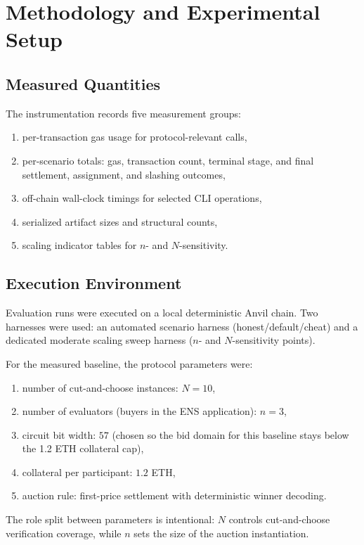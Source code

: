 \documentclass[final,twoside]{vutinfth}
\begin{document}
\section{Methodology and Experimental Setup}
\subsection{Measured Quantities}
The instrumentation records five measurement groups:
\begin{enumerate}
\item per-transaction gas usage for protocol-relevant calls,
\item per-scenario totals: gas, transaction count, terminal stage, and final settlement, assignment, and slashing outcomes,
\item off-chain wall-clock timings for selected CLI operations,
\item serialized artifact sizes and structural counts,
\item scaling indicator tables for \(n\)- and \(N\)-sensitivity.
\end{enumerate}

\subsection{Execution Environment}
Evaluation runs were executed on a local deterministic Anvil chain.
Two harnesses were used: an automated scenario harness
(honest/default/cheat) and a dedicated moderate scaling sweep harness
(\(n\)- and \(N\)-sensitivity points).

For the measured baseline, the protocol parameters were:
\begin{enumerate}
\item number of cut-and-choose instances: $N=10$,
\item number of evaluators (buyers in the ENS application): $n=3$,
\item circuit bit width: $57$ (chosen so the bid domain for this baseline stays below the 1.2 ETH collateral cap),
\item collateral per participant: $1.2$ ETH,
\item auction rule: first-price settlement with deterministic winner decoding.
\end{enumerate}

The role split between parameters is intentional:
\(N\) controls cut-and-choose verification coverage, while \(n\) sets the size
of the auction instantiation.
\end{document}
